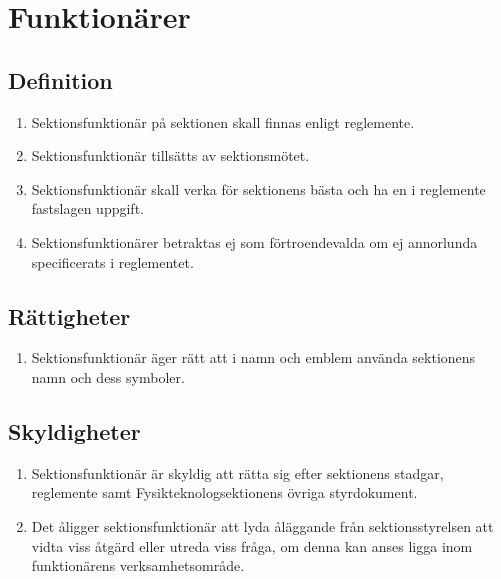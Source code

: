 \documentclass[11pt,a4paper]{article}
\begin{document}
\newpage






\section{Funktionärer}

\subsection{Definition}

\begin{enumerate}[\thesubsection .1]

  \item Sektionsfunktionär på sektionen skall finnas enligt
  reglemente.

  \item Sektionsfunktionär tillsätts av sektionsmötet.

  \item Sektionsfunktionär skall verka för sektionens bästa och ha en
  i reglemente fastslagen uppgift.

  \item Sektionsfunktionärer betraktas ej som förtroendevalda om ej annorlunda specificerats i reglementet.

\end{enumerate}

\subsection{Rättigheter}

\begin{enumerate}[\thesubsection .1]

  \item Sektionsfunktionär äger rätt att i namn och emblem använda
  sektionens namn och dess symboler.

\end{enumerate}

\subsection{Skyldigheter}

\begin{enumerate}[\thesubsection .1]

  \item Sektionsfunktionär är skyldig att rätta sig efter sektionens
  stadgar, reglemente samt Fysikteknologsektionens övriga styrdokument. 

  \item Det åligger sektionsfunktionär att lyda åläggande från
  sektions\-styrel\-sen att vidta viss åtgärd eller utreda viss fråga, om denna kan anses ligga inom funktionärens verksamhetsområde.

\end{enumerate}
\end{document}
